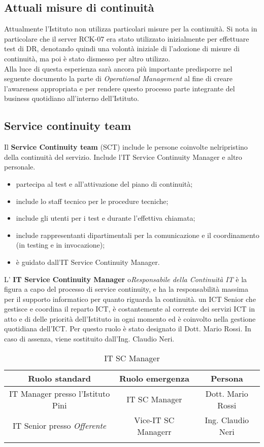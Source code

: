 \subsection{Attuali misure di continuità}
Attualmente l'Istituto non utilizza particolari misure per la continuità. Si nota in particolare che il server RCK-07 era stato utilizzato inizialmente per effettuare test di DR, denotando quindi una volontà iniziale di l'adozione di misure di continuità, ma poi è stato dismesso per altro utilizzo.
\vspace{1cm}
\\ Alla luce di questa esperienza sarà ancora più importante predisporre nel seguente documento la parte di \textit{Operational Management} al fine di creare l'awareness appropriata e per rendere questo processo parte integrante del business quotidiano all'interno dell'Istituto.

\subsection{Service continuity team}
Il \textbf{Service Continuity team} (SCT) include le persone coinvolte nelripristino della continuità del servizio. Include l'IT Service Continuity Manager e altro personale.
\begin{itemize}
\item partecipa al test e all'attivazione del piano di continuità;
\item include lo staff tecnico per le procedure tecniche;
\item include gli utenti per i test e durante l'effettiva chiamata;
\item include rappresentanti dipartimentali per la comunicazione e il coordinamento (in testing e in invocazione);
\item è guidato dall'IT Service Continuity Manager.
\end{itemize}

L' \textbf{IT Service Continuity Manager} o\textit{Responsabile della Continuità IT} è la figura a capo del processo di service continuity, e ha la responsabilità massima per il supporto informatico per quanto riguarda la continuità. un ICT Senior che gestisce e coordina il reparto ICT, è costantemente al corrente dei servizi ICT in atto e di delle priorità dell'Istituto in ogni momento ed è coinvolto nella gestione quotidiana dell'ICT. Per questo ruolo è stato designato il Dott. Mario Rossi. In caso di assenza, viene sostituito dall'Ing. Claudio Neri.

\renewcommand\arraystretch{1,5}
\begin{longtable}{ c c c }
\toprule
\textbf{Ruolo standard} & \textbf{Ruolo emergenza} &\textbf{Persona} \\
\toprule
IT Manager presso l'Istituto Pini & IT SC Manager & Dott. Mario Rossi\\
IT Senior presso \textit{Offerente}& Vice-IT SC Managerr & Ing. Claudio Neri \\
\bottomrule
\caption{IT SC Manager}
\end{longtable}

